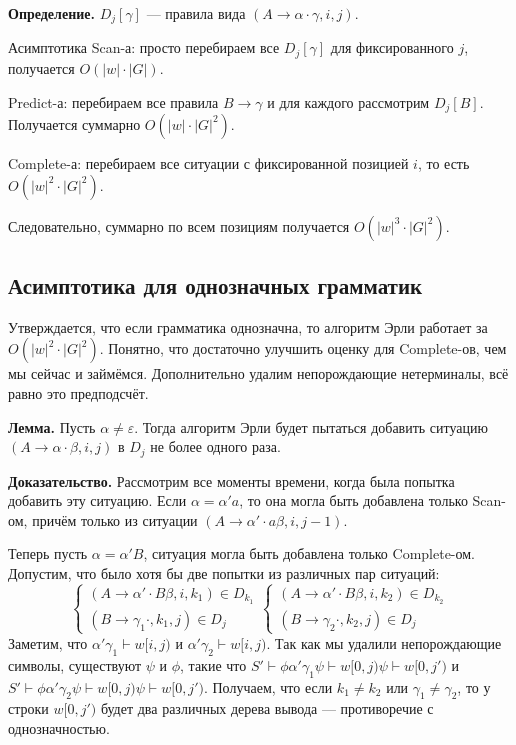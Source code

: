 \textbf{Определение.} $D_j[\gamma]$ --- правила вида $(A \to \alpha \cdot \gamma, i, j)$.

Асимптотика Scan-а: просто перебираем все $D_j[\gamma]$ для фиксированного $j$, получается $O(|w| \cdot |G|)$.

Predict-а: перебираем все правила $B \to \gamma$ и для каждого рассмотрим $D_j[B]$. Получается суммарно $O(|w| \cdot |G|^2)$.

Complete-а: перебираем все ситуации с фиксированной позицией $i$, то есть $O(|w|^2 \cdot |G|^2)$.

Следовательно, суммарно по всем позициям получается $O(|w|^3 \cdot |G|^2)$.

\subsection{Асимптотика для однозначных грамматик}
Утверждается, что если грамматика однозначна, то алгоритм Эрли работает за $O(|w|^2 \cdot |G|^2)$. Понятно, что достаточно улучшить оценку для Complete-ов, чем мы сейчас и займёмся.
Дополнительно удалим непорождающие нетерминалы, всё равно это предподсчёт.

\textbf{Лемма.} Пусть $\alpha \ne \varepsilon$. Тогда алгоритм Эрли будет пытаться добавить ситуацию $(A \to \alpha \cdot \beta, i, j)$ в $D_j$ не более одного раза.

\textbf{Доказательство.} Рассмотрим все моменты времени, когда была попытка добавить эту ситуацию.
Если $\alpha = \alpha' a$, то она могла быть добавлена только Scan-ом, причём только из ситуации $(A \to \alpha' \cdot a \beta, i, j - 1)$.

Теперь пусть $\alpha = \alpha' B$, ситуация могла быть добавлена только Complete-ом. 
Допустим, что было хотя бы две попытки из различных пар ситуаций:
\[
    \begin{cases}
        (A \to \alpha' \cdot B \beta, i, k_1) \in D_{k_1} \\
        (B \to \gamma_1 \cdot, k_1, j) \in D_j
    \end{cases}
    \begin{cases}
        (A \to \alpha' \cdot B \beta, i, k_2) \in D_{k_2} \\
        (B \to \gamma_2 \cdot, k_2, j) \in D_j
    \end{cases}
\]
Заметим, что $\alpha' \gamma_1 \vdash w[i, j)$ и $\alpha' \gamma_2 \vdash w[i, j)$.
Так как мы удалили непорождающие символы, существуют $\psi$ и $\phi$, такие что $S' \vdash \phi \alpha' \gamma_1 \psi \vdash w[0, j) \psi \vdash w[0, j')$ и $S' \vdash \phi \alpha' \gamma_2 \psi \vdash w[0, j) \psi \vdash w[0, j')$.
Получаем, что если $k_1 \ne k_2$ или $\gamma_1 \ne \gamma_2$, то у строки $w[0, j')$ будет два различных дерева вывода --- противоречие с однозначностью.

